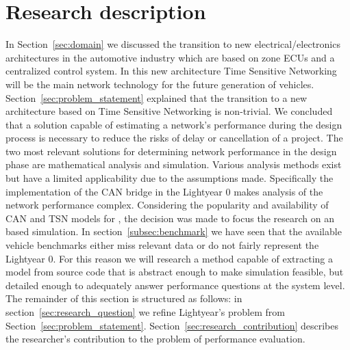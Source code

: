 \section{Research description}
\label{sec:research_description}
In Section~\ref{sec:domain} we discussed the transition to new electrical/electronics architectures in the automotive industry which are based on zone ECUs and a centralized control system. In this new architecture Time Sensitive Networking will be the main network technology for the future generation of vehicles. Section~\ref{sec:problem_statement} explained that the transition to a new architecture based on Time Sensitive Networking is non-trivial. We concluded that a solution capable of estimating a network's performance during the design process is necessary to reduce the risks of delay or cancellation of a project. The two most relevant solutions for determining network performance in the design phase are mathematical analysis and simulation. Various analysis methods exist but have a limited applicability due to the assumptions made. Specifically the implementation of the CAN bridge in the Lightyear 0 makes analysis of the network performance complex. Considering the popularity and availability of CAN and TSN models for \omnet, the decision was made to focus the research on an \omnet based simulation. In section~\ref{subsec:benchmark} we have seen that the available vehicle benchmarks either miss relevant data or do not fairly represent the Lightyear 0. For this reason we will research a method capable of extracting a model from source code that is abstract enough to make simulation feasible, but detailed enough to adequately answer performance questions at the system level. The remainder of this section is structured as follows: in section~\ref{sec:research_question} we refine Lightyear's problem from Section~\ref{sec:problem_statement}. Section~\ref{sec:research_contribution} describes the researcher's contribution to the problem of performance evaluation.



